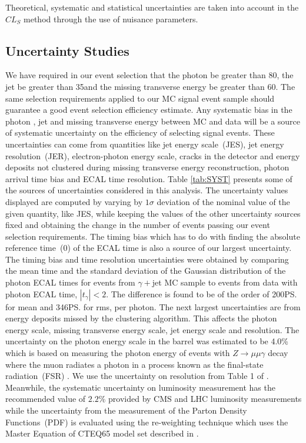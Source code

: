 \newline
Theoretical, systematic and statistical uncertainties are taken into account in the $CL_{S}$ method through the use of nuisance parameters.

\subsection{Uncertainty Studies}
We have required in our event selection that the photon \pt be greater than 80\GeVc, the jet \pt be greater than 35\GeVc and the missing transverse energy be greater than 60\GeV. The same selection requirements applied to our MC signal event sample should guarantee a good event selection efficiency estimate. Any systematic bias in the photon \pt, jet \pt and missing transverse energy between MC and data will be a source of systematic uncertainty on the efficiency of selecting signal events. These uncertainties can come from quantities like jet energy scale~(JES), jet energy resolution~(JER), electron-photon energy scale, cracks in the detector and energy deposits not clustered during missing transverse energy reconstruction, photon arrival time bias and ECAL time resolution. 
\newline
Table \ref{tab:SYST} presents some of the sources of uncertainties considered in this analysis. The uncertainty values displayed are computed by varying by $1\sigma$ deviation of the nominal value of the given quantity, like JES, while keeping the values of the other uncertainty sources fixed and obtaining the change in the number of events passing our event selection requirements. The timing bias which has to do with finding the absolute reference time~(0\ns) of the ECAL time is also a source of our largest uncertainty. The timing bias and time resolution uncertainties were obtained by comparing the mean time and the standard deviation of the Gaussian distribution of the photon ECAL times for events from $\gamma +$jet MC sample to events from data with photon ECAL time, $|t_{\gamma}| < 2$\ns. The difference is found to be of the order of 200\ps for mean and 346\ps for rms, per photon. The next largest uncertainties are from energy deposits missed by the clustering algorithm. This affects the photon energy scale, missing transverse energy scale, jet energy scale and resolution.
The uncertainty on the photon energy scale in the barrel was estimated to be 4.0\%  which is based on measuring the photon energy of events with $Z\rightarrow \mu\mu\gamma$ decay where the muon radiates a photon in a process known as the final-state radiation~(FSR) \cite{PES}. We use the uncertainty on \MET resolution from  Table 1 of \cite{JETMETRES,JES,METRES}. Meanwhile, the systematic uncertainty on luminosity measurement has the recommended value of $2.2$\% provided by CMS and LHC luminosity measurements while the uncertainty from the measurement of the Parton Density Functions~(PDF) is evaluated using the re-weighting technique which uses the Master Equation of CTEQ65 model set described in \cite{PDF}.
